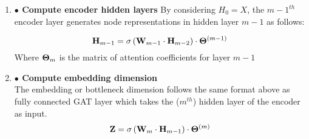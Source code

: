 \documentclass[a4paper,12pt]{article}
\begin{document}
\begin{itemize}
\begin{enumerate}
{\begin{enumerate}
{					Where ${\bf a}_s^T$ and ${\bf a}_v^T$ trainable parameter vectors respective to the representation of node $i$ and $j$ respectively, and $\bf W$ is matrix of parameters for the shared linear transformation of $n_i$ and $n_j$. Furthermore, the Softmax function is used to normalize the attention coefficients so that the coefficients in the neighborhood of node $i$ sum to $1$. $\phi$ is an optional activation function. Following \cite{salehi2019graph} we set $\phi$ to be the identity function.  \\
					\\
					In linear form, the [matrix of] attention coefficients for the $m^{th}$ layer of the model ${\bf \Theta}^{(m)}$ is computed as 
					\[{\bf \Theta}^{(m)} = \text{Softmax}\left(\sigma\left({\bf M}_s^{m} + {\bf M}_v^{m}\right)\right) \]
					\[{\bf M}_s^{m} = {\bf A}\odot \left[{\bf a}_s^{(m)^T} \cdot \phi\left({\bf W}_{m}{\bf H}_{m-1}\right)\right]\]
					\[{\bf M}_v^{m} = {\bf A}\odot \left[{\bf a}_v^{(m)^T}\cdot \phi\left( {\bf W}_{m}{\bf H}_{m-1}\right)\right]^T\]
					
					where
					\[ {\bf \Theta}_{ij}^{(m)} = \begin{cases} \theta_{ij}^{(m)} & \text{if there is and edge between node $i$ and node $j$} \\ 0 & \text{else}\end{cases} \]
					
					Note that in the above equations $\sigma$ is the logistic (sigmoid) function, $\odot$ denotes the element-wise product operation between matrices, and $\phi$ denotes the layer activation function. In the original formulation of GAT by \cite{velivckovic2017graph}, $\phi$ was the identity function, and LeakyReLU was used in place of the sigmoid function.}\\
					
				\item[]{\textbf{$\bullet$ Compute encoder hidden layers}
					By considering $H_0 = X$, the $m-1^{th}$ encoder layer generates node
					representations in hidden layer $m-1$ as follows:
					
					\[ {\bf H}_{m-1} = \sigma\left({\bf W}_{m-1}\cdot {\bf H}_{m-2}\right)\cdot {\bf \Theta}^{(m-1)}\] 
					Where ${\bf \Theta}_{m}$ is the matrix of attention coefficients for layer $m-1$\\
					}
				\newpage
				\item[]{\textbf{$\bullet$ Compute embedding dimension} \\
					The embedding or bottleneck dimension follows the same format above as fully connected GAT layer which takes the ($m^{th}$) hidden layer of the encoder as input.
					\[ {\bf Z} = \sigma\left({\bf W}_m\cdot {\bf H}_{m-1}\right)\cdot {\bf \Theta}^{(m)}\]
					
}
\end{enumerate}}
\end{enumerate}
\end{itemize}
\end{document}
